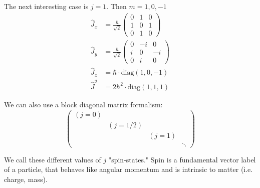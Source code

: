 The next interesting case is $j = 1$. Then $m = 1, 0, -1$
\begin{align*}
    \hat{J}_x &= \frac{\hbar}{\sqrt{2}} \begin{pmatrix}
        0 & 1 & 0 \\ 1 & 0 & 1 \\ 0 & 1 & 0
    \end{pmatrix} \\
    \hat{J}_y &= \frac{\hbar}{\sqrt{2}} \begin{pmatrix}
        0 & -i & 0 \\ i & 0 & -i \\ 0 & i & 0
    \end{pmatrix} \\
    \hat{J}_z &= \hbar \cdot \mathrm{diag}(1, 0, -1) \\
    \hat{J}^2 &= 2\hbar^2 \cdot \mathrm{diag}(1, 1, 1)
\end{align*}

We can also use a block diagonal matrix formalism:
\[ \begin{pmatrix}
    (j = 0) & & & \\
    & (j = 1/2) & & \\
    & & (j = 1) & \\
    & & & \ddots
\end{pmatrix} \]

We call these different values of $j$ "spin-states."
Spin is a fundamental vector label of a particle, that behaves like angular momentum and is intrinsic to matter (i.e. charge, mass).